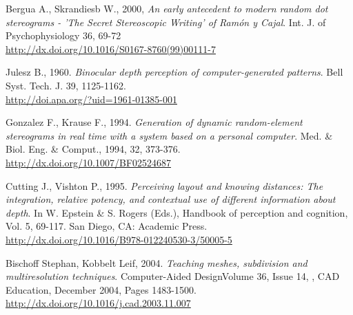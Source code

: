 \begin{thebibliography}{12}
Bergua A., Skrandiesb W., 2000,
\textit{An early antecedent to modern random dot stereograms - 'The Secret Stereoscopic Writing' of Ram\'on y Cajal}.
Int. J. of Psychophysiology 36, 69-72\\
\url{http://dx.doi.org/10.1016/S0167-8760(99)00111-7}

Julesz B., 1960.
\textit{Binocular depth perception of computer-generated patterns}.
Bell Syst. Tech. J. 39, 1125-1162.\\
\url{http://doi.apa.org/?uid=1961-01385-001}

Gonzalez F., Krause F., 1994.
\textit{Generation of dynamic random-element stereograms in real time with a system based on a personal computer}.
Med. \& Biol. Eng. \& Comput., 1994, 32, 373-376.\\
\url{http://dx.doi.org/10.1007/BF02524687}

Cutting J., Vishton P., 1995.
\textit{Perceiving layout and knowing distances: The integration, relative potency, and contextual use of different information about depth}.
In W. Epstein \& S. Rogers (Eds.), Handbook of perception and cognition, Vol. 5, 69-117. San Diego, CA: Academic Press.\\
\url{http://dx.doi.org/10.1016/B978-012240530-3/50005-5}

Bischoff Stephan, Kobbelt Leif, 2004.
\textit{Teaching meshes, subdivision and multiresolution techniques}.
Computer-Aided DesignVolume 36, Issue 14, , CAD Education, December 2004, Pages 1483-1500.\\
\url{http://dx.doi.org/10.1016/j.cad.2003.11.007}

\end{thebibliography}

\renewcommand*\refname{Links}

